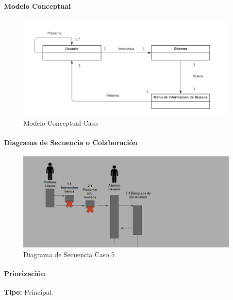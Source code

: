 \paragraph{Modelo Conceptual}

\begin{figure}[H]
\centerline{\includegraphics[width=15cm]{imgs/ModeloConceptualCaso_5_3.png}}
\caption{Modelo Conceptual Caso }
\label{fig_5_2}
\end{figure}

\paragraph{Diagrama de Secuencia o Colaboración}

\begin{figure}[H]
\centerline{\includegraphics[width=15cm]{imgs/CasoUso_5_2.PNG}}
\caption{Diagrama de Secuencia Caso 5}
\label{fig_5_3}
\end{figure}

\paragraph{Priorización}
{\textbf {Tipo:}}
Principal.